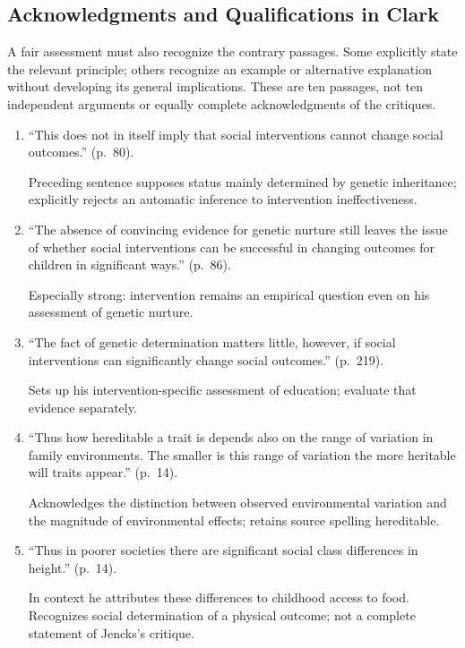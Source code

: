 \subsection{Acknowledgments and Qualifications in Clark}

A fair assessment must also recognize the contrary passages. Some
explicitly state the relevant principle; others recognize an example or
alternative explanation without developing its general implications.
These are ten passages, not ten independent arguments or equally complete
acknowledgments of the critiques.

\begin{enumerate}[label=\arabic*.]
\item ``This does not in itself imply that social interventions cannot change social outcomes.'' (p.~80).

Preceding sentence supposes status mainly determined by genetic inheritance; explicitly rejects an automatic inference to intervention ineffectiveness.

\item ``The absence of convincing evidence for genetic nurture still leaves the issue of whether social interventions can be successful in changing outcomes for children in significant ways.'' (p.~86).

Especially strong: intervention remains an empirical question even on his assessment of genetic nurture.

\item ``The fact of genetic determination matters little, however, if social interventions can significantly change social outcomes.'' (p.~219).

Sets up his intervention-specific assessment of education; evaluate that evidence separately.

\item ``Thus how hereditable a trait is depends also on the range of variation in family environments. The smaller is this range of variation the more heritable will traits appear.'' (p.~14).

Acknowledges the distinction between observed environmental variation and the magnitude of environmental effects; retains source spelling hereditable.

\item ``Thus in poorer societies there are significant social class differences in height.'' (p.~14).

In context he attributes these differences to childhood access to food. Recognizes social determination of a physical outcome; not a complete statement of Jencks's critique.


\end{enumerate}
